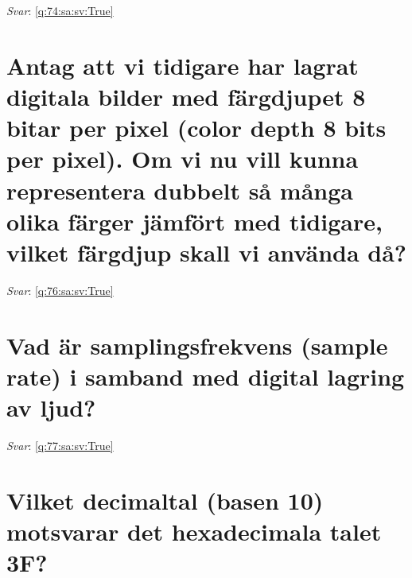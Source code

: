 \documentclass[a4paper,11pt,oneside]{book}
\begin{document}
\begin{sloppypar}
\label{q:74:sa:sv:False}

\vspace{2cm}

\noindent\makebox[\textwidth]{\hrulefill}

\vspace{1cm}

\textit{Svar}: \autoref{q:74:sa:sv:True}



\section{Antag att vi tidigare har lagrat digitala bilder med f\"argdjupet 8 bitar per pixel (color depth 8 bits per pixel). Om vi nu vill kunna representera dubbelt s\r{a} m\r{a}nga olika f\"arger j\"amf\"ort med tidigare, vilket f\"argdjup skall vi anv\"anda d\r{a}?}

\label{q:76:sa:sv:False}

\vspace{2cm}

\noindent\makebox[\textwidth]{\hrulefill}

\vspace{1cm}

\textit{Svar}: \autoref{q:76:sa:sv:True}



\section{Vad \"ar samplingsfrekvens (sample rate) i samband med digital lagring av ljud?}

\label{q:77:sa:sv:False}

\vspace{2cm}

\noindent\makebox[\textwidth]{\hrulefill}

\vspace{1cm}

\textit{Svar}: \autoref{q:77:sa:sv:True}



\section{Vilket decimaltal (basen 10) motsvarar det hexadecimala talet 3F?}

\label{q:78:sa:sv:False}

\vspace{2cm}

\noindent\makebox[\textwidth]{\hrulefill}


\end{sloppypar}
\end{document}
